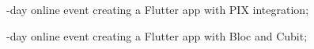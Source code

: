 \documentclass[
    10pt,
    english,
]{article}
\begin{document}
\noindent {}
{-day online event creating a Flutter app with PIX integration;}

\noindent {}
{-day online event creating a Flutter app with Bloc and Cubit;}
\end{document}
